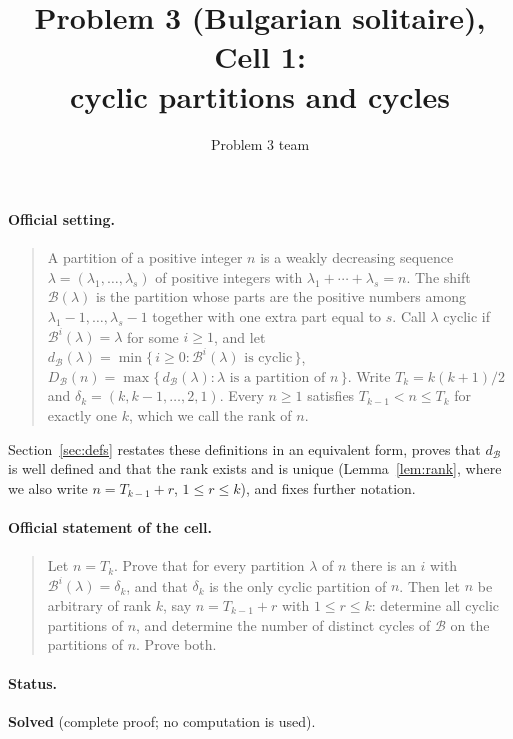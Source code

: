 \documentclass[11pt]{article}
\author{Problem 3 team}
\title{Problem 3 (Bulgarian solitaire), Cell 1:\\ cyclic partitions and cycles}
\date{}
\theoremstyle{definition}
\newcommand{\B}{\mathcal{B}}
\newcommand{\dB}{d_{\mathcal{B}}}
\newcommand{\DB}{D_{\mathcal{B}}}
\renewcommand{\le}{\leqslant}
\renewcommand{\ge}{\geqslant}
\begin{document}
\maketitle

\paragraph{Official setting.}
\begin{quote}
A partition of a positive integer $n$ is a weakly decreasing sequence $\lambda=(\lambda_1,\dots,\lambda_s)$ of
positive integers with $\lambda_1+\cdots+\lambda_s=n$.  The shift $\B(\lambda)$ is the partition whose parts are the
positive numbers among $\lambda_1-1,\dots,\lambda_s-1$ together with one extra part equal to $s$.  Call $\lambda$
cyclic if $\B^i(\lambda)=\lambda$ for some $i\ge1$, and let $\dB(\lambda)=\min\{\,i\ge0:\B^i(\lambda)\text{ is cyclic}\,\}$,
$\DB(n)=\max\{\,\dB(\lambda):\lambda\text{ is a partition of }n\,\}$.  Write $T_k=k(k+1)/2$ and
$\delta_k=(k,k-1,\dots,2,1)$.  Every $n\ge1$ satisfies $T_{k-1}<n\le T_k$ for exactly one $k$, which we call the
rank of $n$.
\end{quote}
Section~\ref{sec:defs} restates these definitions in an equivalent form, proves that $\dB$ is well defined and
that the rank exists and is unique (Lemma~\ref{lem:rank}, where we also write $n=T_{k-1}+r$, $1\le r\le k$), and
fixes further notation.

\paragraph{Official statement of the cell.}
\begin{quote}
Let $n=T_k$.  Prove that for every partition $\lambda$ of $n$ there is an $i$ with $\B^i(\lambda)=\delta_k$, and that
$\delta_k$ is the only cyclic partition of $n$.  Then let $n$ be arbitrary of rank $k$, say $n=T_{k-1}+r$ with
$1\le r\le k$: determine all cyclic partitions of $n$, and determine the number of distinct cycles of $\B$ on the
partitions of $n$.  Prove both.
\end{quote}

\paragraph{Status.} \textbf{Solved} (complete proof; no computation is used).
\end{document}
